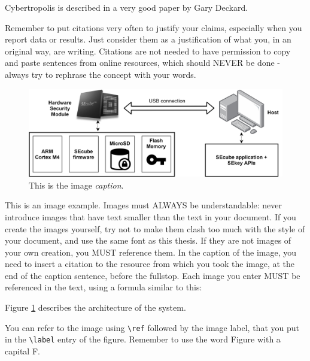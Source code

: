 \begin{center}
	Cybertropolis \cite{deckard2018cybertropolis} is described in a very good paper by Gary Deckard.
\end{center}

Remember to put citations very often to justify your claims, especially when you report data or results. Just consider them as a justification of what you, in an original way, are writing. Citations are not needed to have permission to copy and paste sentences from online resources, which should NEVER be done - always try to rephrase the concept with your words.

\begin{figure}[h!]
	\vspace{0.5cm}
	\includegraphics[width=\textwidth]{images/simplearch.jpg}
	\caption{This is the image \emph{caption}.}
	\label{fig:generalschema} %
\end{figure}

This is an image example. Images must ALWAYS be understandable: never introduce images that have text smaller than the text in your document. If you create the images yourself, try not to make them clash too much with the style of your document, and use the same font as this thesis.
If they are not images of your own creation, you MUST reference them. In the caption of the image, you need to insert a citation to the resource from which you took the image, at the end of the caption sentence, before the fullstop.
Each image you enter MUST be referenced in the text, using a formula similar to this:

\begin{center}
	Figure \ref{fig:generalschema} describes the architecture of the system.
\end{center}

You can refer to the image using \lstinline{\ref} followed by the image label, that you put in the \lstinline{\label} entry of the figure. Remember to use the word Figure with a capital F.

